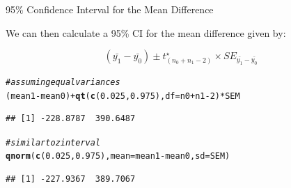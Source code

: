 \documentclass{beamer}\usepackage[]{graphicx}\usepackage[]{color}
\newcommand{\hlnum}[1]{\textcolor[rgb]{0.686,0.059,0.569}{#1}}%
\newcommand{\hlcom}[1]{\textcolor[rgb]{0.678,0.584,0.686}{\textit{#1}}}%
\newcommand{\hlopt}[1]{\textcolor[rgb]{0,0,0}{#1}}%
\newcommand{\hlstd}[1]{\textcolor[rgb]{0.345,0.345,0.345}{#1}}%
\newcommand{\hlkwc}[1]{\textcolor[rgb]{0.333,0.667,0.333}{#1}}%
\newcommand{\hlkwd}[1]{\textcolor[rgb]{0.737,0.353,0.396}{\textbf{#1}}}%
\newenvironment{knitrout}{}{} %
\begin{document}
\begin{frame}[fragile]{95\% Confidence Interval for the Mean Difference}

We can then calculate a 95\% CI for the mean difference given by:

\begin{equation}
(\bar{y_1} - \bar{y_0}) \pm t^\star_{(n_0 + n_1 - 2)} \times SE_{\bar{y_1} - \bar{y_0}}
\end{equation}

\pause 

\begin{knitrout}\scriptsize
{}\color{fgcolor}
\begin{alltt}
\hlcom{# assuming equal variances}
\hlstd{(mean1} \hlopt{-} \hlstd{mean0)} \hlopt{+} \hlkwd{qt}\hlstd{(}\hlkwd{c}\hlstd{(}\hlnum{0.025}\hlstd{,} \hlnum{0.975}\hlstd{),} \hlkwc{df} \hlstd{= n0} \hlopt{+} \hlstd{n1} \hlopt{-} \hlnum{2}\hlstd{)} \hlopt{*} \hlstd{SEM}
\end{alltt}
\begin{verbatim}
## [1] -228.8787  390.6487
\end{verbatim}
\begin{alltt}
\hlcom{# similar to z interval}
\hlkwd{qnorm}\hlstd{(}\hlkwd{c}\hlstd{(}\hlnum{0.025}\hlstd{,} \hlnum{0.975}\hlstd{),} \hlkwc{mean} \hlstd{= mean1} \hlopt{-} \hlstd{mean0,} \hlkwc{sd} \hlstd{= SEM)}
\end{alltt}
\begin{verbatim}
## [1] -227.9367  389.7067
\end{verbatim}

\end{knitrout}


\end{frame}
\end{document}
